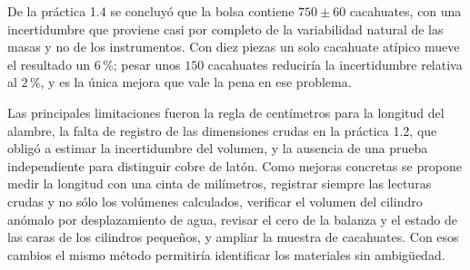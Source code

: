 De la práctica 1.4 se concluyó que la bolsa contiene $750 \pm 60$ cacahuates, con una incertidumbre que proviene casi por completo de la variabilidad natural de las masas y no de los instrumentos. Con diez piezas un solo cacahuate atípico mueve el resultado un $6\,\%$; pesar unos $150$ cacahuates reduciría la incertidumbre relativa al $2\,\%$, y es la única mejora que vale la pena en ese problema.

Las principales limitaciones fueron la regla de centímetros para la longitud del alambre, la falta de registro de las dimensiones crudas en la práctica 1.2, que obligó a estimar la incertidumbre del volumen, y la ausencia de una prueba independiente para distinguir cobre de latón. Como mejoras concretas se propone medir la longitud con una cinta de milímetros, registrar siempre las lecturas crudas y no sólo los volúmenes calculados, verificar el volumen del cilindro anómalo por desplazamiento de agua, revisar el cero de la balanza y el estado de las caras de los cilindros pequeños, y ampliar la muestra de cacahuates. Con esos cambios el mismo método permitiría identificar los materiales sin ambigüedad.
